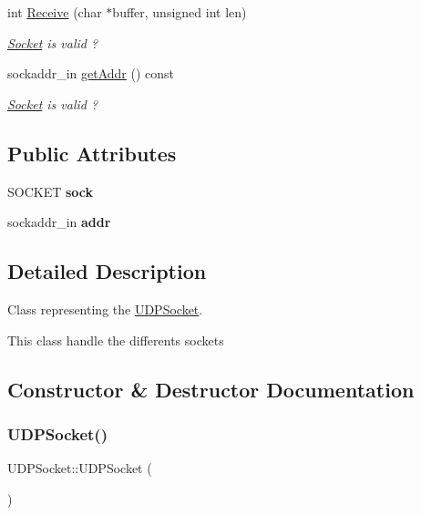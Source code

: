 \begin{DoxyCompactItemize}
int \hyperlink{class_u_d_p_socket_a0193bec0a3668e7bf9ca043bb4152ab8}{Receive} (char $\ast$buffer, unsigned int len)
\begin{DoxyCompactList}\small\item\em \hyperlink{class_socket}{Socket} is valid ? \end{DoxyCompactList}\item 
sockaddr\+\_\+in \hyperlink{class_u_d_p_socket_a54eb0e16443ae0cab6a7bbc3d5ac4c5f}{get\+Addr} () const
\begin{DoxyCompactList}\small\item\em \hyperlink{class_socket}{Socket} is valid ? \end{DoxyCompactList}\end{DoxyCompactItemize}
\subsection*{Public Attributes}
\begin{DoxyCompactItemize}
\item 
\mbox{\label{class_u_d_p_socket_a70085ad4b4b8c09258f206843db08de2}} 
S\+O\+C\+K\+ET {\bfseries sock}
\item 
\mbox{\label{class_u_d_p_socket_a85db9e3a4b4448e3a2e6988fed4cc5c6}} 
sockaddr\+\_\+in {\bfseries addr}
\end{DoxyCompactItemize}


\subsection{Detailed Description}
Class representing the \hyperlink{class_u_d_p_socket}{U\+D\+P\+Socket}. 

This class handle the differents sockets 

\subsection{Constructor \& Destructor Documentation}
\mbox{\label{class_u_d_p_socket_a4f86f3023f5a08f6355802599a10e100}} 
\subsubsection{\texorpdfstring{U\+D\+P\+Socket()}{UDPSocket()}}
{\footnotesize\ttfamily U\+D\+P\+Socket\+::\+U\+D\+P\+Socket (\begin{DoxyParamCaption}{ }\end{DoxyParamCaption})}



